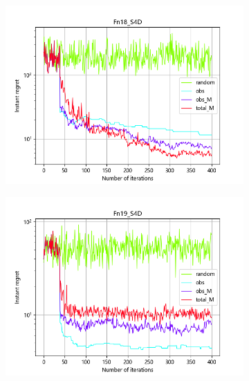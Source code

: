 \documentclass{article}
\begin{document}
\begin{figure}[H]
\begin{subfigure}[t]{.32\linewidth}
        \includegraphics[width=1\textwidth]{pictures/Homo_noise_4D/S/Fn18_S4D_ins.png}
    \end{subfigure}
    \begin{subfigure}[t]{.32\linewidth}
        \centering
        \includegraphics[width=1\textwidth]{pictures/Homo_noise_4D/S/Fn19_S4D_ins.png}
    \end{subfigure}
    \begin{subfigure}[t]{.32\linewidth}
        \centering

\end{subfigure}
\end{figure}
\end{document}
